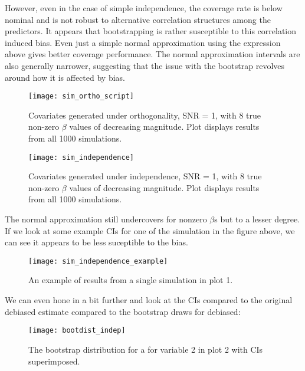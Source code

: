 However, even in the case of simple independence, the coverage rate is below nominal and is not robust to alternative correlation structures among the predictors. It appears that bootstrapping is rather susceptible to this correlation induced bias. Even just a simple normal approximation using the expression above gives better coverage performance. The normal approximation intervals are also generally narrower, suggesting that the issue with the bootstrap revolves around how it is affected by bias.

\begin{figure}[hbtp]
    \begin{center}
    \texttt{[image: sim\_ortho\_script]}
    \caption{\label{Fig:sim_ortho} Covariates generated under orthogonality, SNR = 1, with 8 true non-zero $\beta$ values of decreasing magnitude. Plot displays results from all 1000 simulations.}
    \end{center}
\end{figure}

\begin{figure}[hbtp]
    \begin{center}
    \texttt{[image: sim\_independence]}
    \caption{\label{Fig:sim_independence} Covariates generated under independence, SNR = 1, with 8 true non-zero $\beta$ values of decreasing magnitude. Plot displays results from all 1000 simulations.}
    \end{center}
\end{figure}

The normal approximation still undercovers for nonzero $\beta$s but to a lesser degree. If we look at some example CIs for one of the simulation in the figure above, we can see it appears to be less suceptible to the bias.

\begin{figure}[hbtp]
    \begin{center}
    \texttt{[image: sim\_independence\_example]}
    \caption{\label{Fig:sim_independence_exaple} An example of results from a single simulation in plot 1.}
    \end{center}
\end{figure}

We can even hone in a bit further and look at the CIs compared to the original debiased estimate compared to the bootstrap draws for debiased:

\begin{figure}[hbtp]
    \begin{center}
    \texttt{[image: bootdist\_indep]}
    \caption{\label{Fig:bootdist_indep} The bootstrap distribution for a for variable 2 in plot 2 with CIs superimposed. }
    \end{center}
\end{figure}


